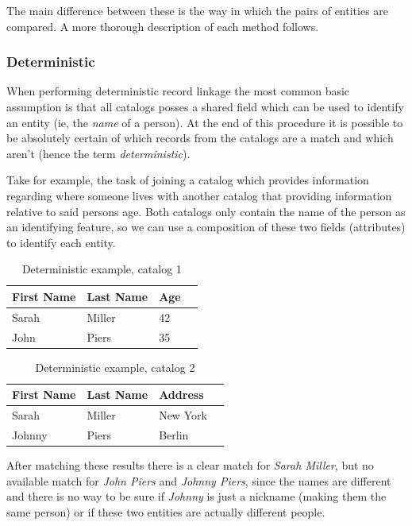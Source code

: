 \documentclass[epsfig,a4paper,11pt,titlepage,twoside,openany]{book}
\begin{document}
The main difference between these is the way in which the pairs of entities are compared. A more thorough description of each method follows.


\subsubsection{Deterministic}
\label{sec:rl-approach-deterministic}

When performing deterministic record linkage the most common basic assumption is that
all catalogs posses a shared field which can be used to identify an entity (ie, the
\textit{name} of a person). At the end of this procedure it is possible to be absolutely certain of
which records from the catalogs are a match and which aren't (hence the term
\textit{deterministic}).

Take for example, the task of joining a catalog which provides information regarding where someone
lives with another catalog that providing information relative to said persons age. Both catalogs only contain the
name of the person as an identifying feature, so we can use a composition of
these two fields (attributes) to identify each entity.

\begin{table}[H]
  \centering{}
  \begin{tabular}{|l|l|l|l|}
    First Name & Last Name & Age \\ \hline
    Sarah & Miller & 42 \\
    John  & Piers  & 35  \\ 
  \end{tabular}
  \caption{Deterministic example, catalog 1}
  \label{tab:ex-deterministic-1}
\end{table}


\begin{table}[H]
  \centering{}
  \begin{tabular}{|l|l|l|l|}
    First Name & Last Name & Address \\ \hline
    Sarah  & Miller & New York \\
    Johnny & Piers  & Berlin  \\ 
  \end{tabular}
  \caption{Deterministic example, catalog 2}
  \label{tab:ex-deterministic-2}
\end{table}

After matching these results there is a clear match for \textit{Sarah Miller}, but no available match for \textit{John Piers} and \textit{Johnny Piers}, since the
names are different and there is no way to be sure if \textit{Johnny} is just a nickname (making them the same person)
or if these two entities are actually different people.
\end{document}
